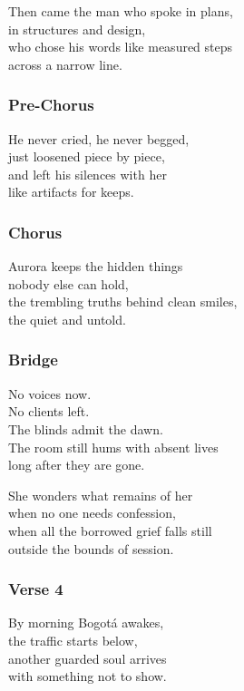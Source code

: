 Then came the man who spoke in plans,\\
in structures and design,\\
who chose his words like measured steps\\
across a narrow line.

\subsubsection{Pre-Chorus}\label{pre-chorus-15}

He never cried, he never begged,\\
just loosened piece by piece,\\
and left his silences with her\\
like artifacts for keeps.

\subsubsection{Chorus}\label{chorus-25}

Aurora keeps the hidden things\\
nobody else can hold,\\
the trembling truths behind clean smiles,\\
the quiet and untold.

\subsubsection{Bridge}\label{bridge-7}

No voices now.\\
No clients left.\\
The blinds admit the dawn.\\
The room still hums with absent lives\\
long after they are gone.

She wonders what remains of her\\
when no one needs confession,\\
when all the borrowed grief falls still\\
outside the bounds of session.

\subsubsection{Verse 4}\label{verse-4-3}

By morning Bogotá awakes,\\
the traffic starts below,\\
another guarded soul arrives\\
with something not to show.

